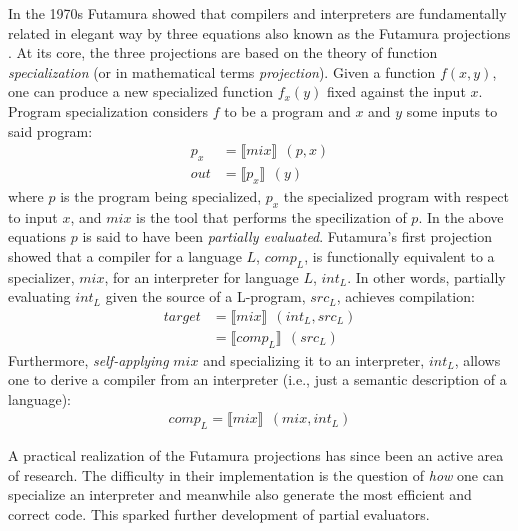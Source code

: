 \documentclass[a4paper,12pt,twoside,openright]{report}
\theoremstyle{definition}
\begin{document}
In the 1970s Futamura showed that compilers and interpreters are fundamentally related in elegant way by three equations also known as the Futamura projections \cite{futamura1999partial}. At its core, the three projections are based on the theory of function \textit{specialization} (or in mathematical terms \textit{projection}). Given a function $f(x,y)$, one can produce a new specialized function $f_{x}(y)$ fixed against the input $x$. Program specialization considers $f$ to be a program and $x$ and $y$ some inputs to said program:
\begin{align*}
    p_{x} & = \llbracket mix \rrbracket \:\: (p, x) \\
    out & = \llbracket p_{x} \rrbracket \:\: (y)
\end{align*}
where $p$ is the program being specialized, $p_{x}$ the specialized program with respect to input $x$, and $mix$ is the tool that performs the specilization of $p$. In the above equations $p$ is said to have been \textit{partially evaluated}. Futamura's first projection showed that a compiler for a language $L$, $comp_{L}$, is functionally equivalent to a specializer, $mix$, for an interpreter for language $L$, $int_{L}$. In other words, partially evaluating $int_{L}$ given the source of a L-program, $src_{L}$, achieves compilation:
\begin{align*}
    target & = \llbracket mix \rrbracket \:\: (int_{L}, src_{L}) \\
           & = \llbracket comp_{L} \rrbracket \:\: (src_{L})
\end{align*}
Furthermore, \textit{self-applying} $mix$ and specializing it to an interpreter, $int_{L}$, allows one to derive a compiler from an interpreter (i.e., just a semantic description of a language):
\begin{align*}
    comp_{L} = \llbracket mix \rrbracket \:\: (mix, int_{L})
\end{align*}

A practical realization of the Futamura projections has since been an active area of research. The difficulty in their implementation is the question of \textit{how} one can specialize an interpreter and meanwhile also generate the most efficient and correct code. This sparked further development of partial evaluators.
\end{document}
